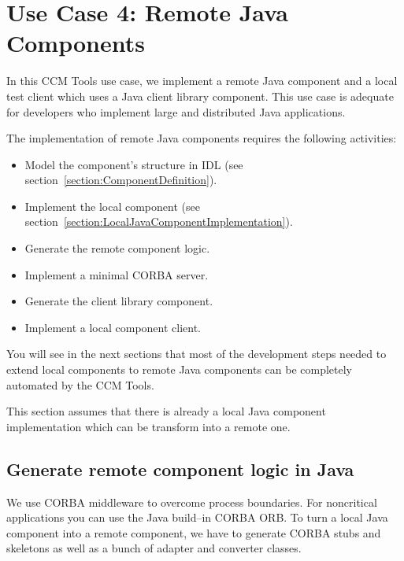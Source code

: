 \section{Use Case 4: Remote Java Components}
\label{section:RemoteJavaComponentImplementation}

In this CCM Tools use case, we implement a remote Java component and a local
test client which uses a Java client library component.
This use case is adequate for developers who implement large and distributed
Java applications.
 
\vspace{3mm}
The implementation of remote Java components requires the following activities:
\begin{itemize}
	\item Model the component's structure in IDL (see section~\ref{section:ComponentDefinition}). 
	\item Implement the local component (see section~\ref{section:LocalJavaComponentImplementation}).
	\item Generate the remote component logic.
	\item Implement a minimal CORBA server.
	\item Generate the client library component.
	\item Implement a local component client.
\end{itemize}

You will see in the next sections that most of the development steps needed to
extend local components to remote Java components can be completely automated by
the CCM Tools.

\vspace{3mm}
This section assumes that there is already a local Java component implementation
which can be transform into a remote one.


\subsection{Generate remote component logic in Java}
\label{subsection:GenerateRemoteComponentLogicJava}
We use CORBA middleware to overcome process boundaries.
For noncritical applications you can use the Java build--in CORBA ORB.
To turn a local Java component into a remote component, we have to generate CORBA
stubs and skeletons as well as a bunch of adapter and converter classes.

